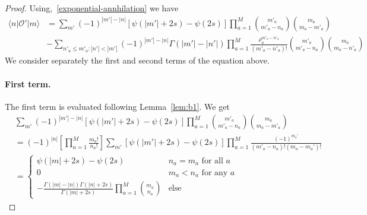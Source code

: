 \documentclass[11pt]{article}
\numberwithin{equation}{section}
\newcommand{\M}{M}
\begin{document}
\begin{proof}
Using,~\eqref{exponential-annhilation} we have
\begin{equation}\label{to-find-exact}
\begin{split}
\langle n|\mathcal{O}'|m\rangle
 &=\sum_{m'}(-1)^{|m'|-|n|}\left[\psi(|m'|+2s)-\psi(2s)\right]\prod_{a=1}^{\M}\binom{m'_{a}}{m'_{a}-n_a}\binom{m_{a}}{m_{a}-m'_a} \\
 &-\sum_{n'_a\leq m'_a:|n'|< |m'|} (-1)^{|m'|-|n|}   \Gamma (|m'|-|n'|)    \prod_{a=1}^{\M}\frac{\rho_{a}^{m'_{a}-n'_a}}{(m'_{a}-n'_a)!}\binom{m'_{a}}{m'_{a}-n_a} \binom{m_{a}}{m_{a}-n'_a}
 \end{split}
\end{equation}
	We consider separately the first and second terms of the equation above.
\paragraph{First term.}

	The first term is evaluated following Lemma~\ref{lem:b1}. We get 		\begin{equation}
			\begin{split}
				& \sum_{m'}(-1)^{|m'|-|n|}\left[\psi(|m'|+2s)-\psi(2s)\right]\prod_{a=1}^{\M}\binom{m'_{a}}{m'_{a}-n_a}\binom{m_{a}}{m_{a}-m'_a} \\
				& =(-1)^{|n|}\left[\prod_{a=1}^{\M}\frac{m_a!}{n_a!}\right]\sum_{m'}\left[\psi(|m'|+2s)-\psi(2s)\right]\prod_{a=1}^{\M}\frac{(-1)^{m_a'}}{(m'_a-n_a)!(m_a-m_a')!}\\
				&=\begin{cases}
					\psi(|m|+2s)-\psi(2s)& n_a=m_a \text{ for all } a\\
					0& m_a<n_a \text{ for any } a\\
					-\frac{ \Gamma (|m|-|n|) \Gamma (|n|+2 s)}{\Gamma (|m|+2 s)}\prod_{a=1}^\M\binom{m_a}{n_a}
					& \text{else}
				\end{cases}
							\end{split}
		\end{equation}
		
		
		
		
		
		
		

\end{proof}
\end{document}

